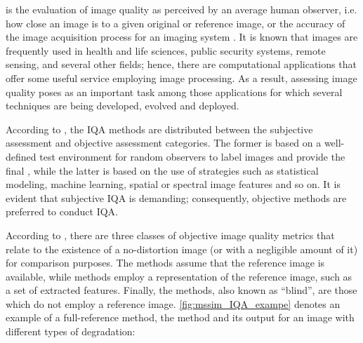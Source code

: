  is the evaluation of image quality as perceived by an average human observer, i.e. how close an image is to a given original or reference image, or the accuracy of the image acquisition process for an imaging system \cite{bovik2009essential}. It is known that images are frequently used in health and life sciences, public security systems, remote sensing, and several other fields; hence, there are computational applications that offer some useful service employing image processing. As a result, assessing image quality poses as an important task among those applications for which several techniques are being developed, evolved and deployed.

According to , the IQA methods are distributed between the subjective assessment and objective assessment categories. The former is based on a well-defined test environment for random observers to label images and provide the final , while the latter is based on the use of strategies such as statistical modeling, machine learning, spatial or spectral image features and so on. It is evident that subjective IQA is demanding; consequently, objective methods are preferred to conduct IQA.

According to , there are three classes of objective image quality metrics that relate to the existence of a no-distortion image (or with a negligible amount of it) for comparison purposes. The  methods assume that the reference image is available, while  methods employ a representation of the reference image, such as a set of extracted features. Finally, the  methods, also known as ``blind'', are those which do not employ a reference image. \autoref{fig:mssim_IQA_exampe} denotes an example of a full-reference method, the  method and its output for an image with different types of degradation:

